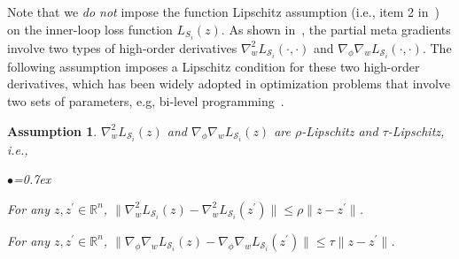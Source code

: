 \documentclass{osudissert96}
\newtheorem{assum}{Assumption}
\begin{document}
Note that we {\em do not} impose the function Lipschitz assumption (i.e., item 2 in~) on the inner-loop loss function $L_{S_i}(z)$.
As shown in~,  the partial meta gradients involve two types of high-order derivatives {\small$\nabla_w^2 L_{\mathcal{S}_i}(\cdot,\cdot)$} and {\small$\nabla_\phi\nabla_w L_{\mathcal{S}_i}(\cdot,\cdot)$}. 
The following assumption imposes a Lipschitz condition for these two high-order derivatives, which has been widely adopted in optimization problems that involve two sets of parameters, e.g, bi-level programming~\cite{ghadimi2018approximation}.
\begin{assum}\label{assm:second} $\nabla_w^2 L_{\mathcal{S}_i}(z)$ and $\nabla_\phi\nabla_w L_{\mathcal{S}_i}(z)$ are $\rho$-Lipschitz and $\tau$-Lipschitz, i.e., 
\begin{list}{$\bullet$}{\topsep=0.7ex \leftmargin=0.3in \rightmargin=0.5in \itemsep =0.05in}
\vspace{0.2cm}
\item For any $z,z^\prime\in\mathbb{R}^{n}$, $\|\nabla^2_w L_{\mathcal{S}_i}(z) - \nabla^2_w L_{\mathcal{S}_i}(z^\prime)\| \leq \rho \|z - z^\prime\|$.
\item For any $z,z^\prime\in\mathbb{R}^{n}$, $\|\nabla_\phi \nabla_w L_{\mathcal{S}_i}(z) - \nabla_\phi\nabla_w L_{\mathcal{S}_i}(z^\prime)\| \leq \tau\|z-z^\prime\|$.
\end{list}
\end{assum}
\end{document}

